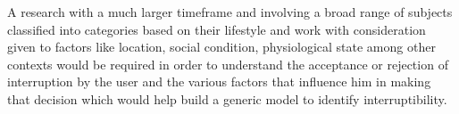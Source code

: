 \documentclass[10pt,a4paper]{article}
\begin{document}
A research with a much larger timeframe and involving a broad range of subjects classified into categories based on their lifestyle and work with consideration given to factors like location, social condition, physiological state among other contexts would be required in order to understand the acceptance or rejection of interruption by the user and the various factors that influence him in making that decision which would help build a generic model to identify interruptibility.



\end{document}
